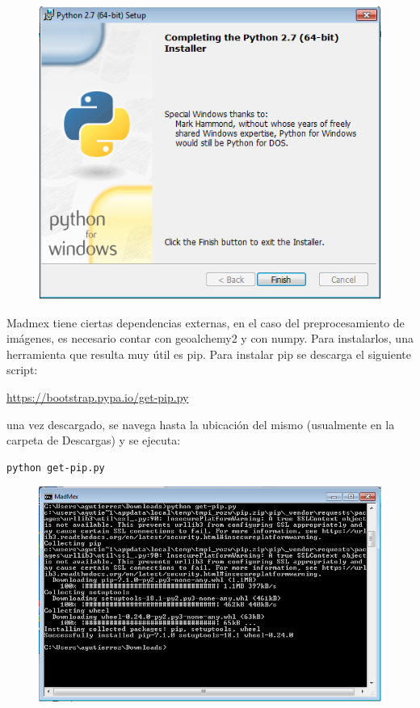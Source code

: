 \documentclass[11pt, spanish]{memoir}
\begin{document}
\begin{figure}[H]
\centering
\includegraphics[width=14cm]{python5.png}
\end{figure}

Madmex tiene ciertas dependencias externas, en el caso del preprocesamiento de imágenes,
es necesario contar con geoalchemy2 y con numpy. Para instalarlos, una herramienta que resulta muy útil es pip. Para instalar pip se descarga el siguiente script:

\url{https://bootstrap.pypa.io/get-pip.py}

una vez descargado, se navega hasta la ubicación del mismo (usualmente en la carpeta de Descargas) y se ejecuta:

\begin{lstlisting} 
python get-pip.py
\end{lstlisting}

\begin{figure}[H]
\centering
\includegraphics[width=14cm]{pip.png}
\end{figure}
\end{document}
